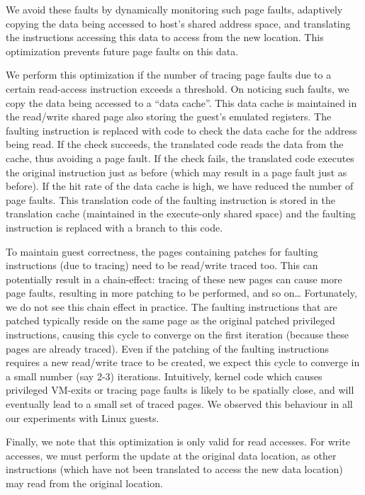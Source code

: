\documentclass[10pt,twocolumn]{article}
\begin{document}
We avoid these faults by dynamically monitoring such page faults, adaptively
copying the data being accessed to host's shared address space, and
translating the instructions accessing this data to access from the new location.
This optimization prevents future page faults on this data.

We perform this optimization if the number of tracing page faults
due to a certain read-access instruction exceeds a threshold. On noticing
such faults, we copy the data being accessed
to a ``data cache''. This data cache is maintained in the read/write shared page
also storing the guest's emulated registers.
The faulting instruction is replaced with
code to check the data cache for the address being read. If the check succeeds, the
translated code reads the data from the cache, thus avoiding a page fault.
If the check fails, the translated code executes the original
instruction just as before (which may result in a page fault just as before).
If the hit rate of the data cache is high, we have reduced the number of page faults.
This translation code of the faulting instruction is stored in the translation
cache (maintained in the execute-only shared space) and the faulting
instruction is replaced with a branch to this code.

To maintain guest correctness, the pages containing patches for
faulting instructions (due to tracing) need to be read/write traced too.
This can potentially result in a chain-effect: tracing of these new pages
can cause more page faults, resulting in more patching to be performed, and so on\ldots
Fortunately, we do not see this chain effect in practice. The faulting instructions
that are patched typically reside on the same
page as the original patched privileged instructions, causing this
cycle to converge on the first iteration (because these pages are already traced).
Even if the patching of the faulting instructions requires a new read/write trace to be
created, we expect this
cycle to converge in a small number (say 2-3) iterations. Intuitively, kernel
code which causes privileged
VM-exits or tracing page faults is likely to be spatially close, and will eventually
lead to a small set of traced pages. We observed this behaviour in all our experiments
with Linux guests.

Finally, we note that this optimization is only valid for read accesses. For write
accesses, we must perform the update at the original data location, as other
instructions (which have not been translated to access the new data location) may
read from the original location.
\end{document}
